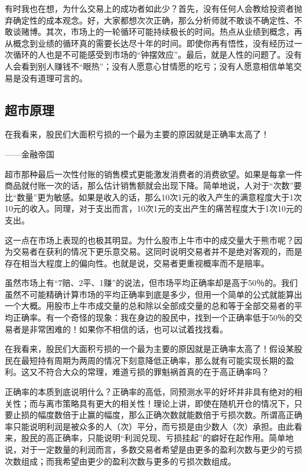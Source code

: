 有时我也在想，为什么交易上的成功者如此少？首先，没有任何人会教给投资者抛弃确定性的成本观念。好，大家都想次次正确，那么分析师就不敢谈不确定性、不敢谈赌博。其次，市场上的一轮循环可能持续极长的时间。热点从业绩到概念，再从概念到业绩的循环真的需要长达尽十年的时间。即使你再有悟性，没有经历过一次循环的人也是不可能感受到市场的“钟摆效应”。最后，就是人性的问题了。没有人会看到别人赚钱不“眼热”；没有人愿意心甘情愿的吃亏；没有人愿意相信单笔交易是没有道理可言的。

\subsection{超市原理}

{\kaishu
在我看来，股民们大面积亏损的一个最为主要的原因就是正确率太高了！

\hfill ——金融帝国
}

超市那种最后一次性付账的销售模式更能激发消费者的消费欲望。如果是每拿一件商品就付账一次的话，那么估计销售额就会出现下降。简单地说，人对于“次数”要比“数量”更为敏感。如果是收入的话，那么10次1元的收入产生的满意程度大于1次10元的收入。同理，对于支出而言，10次1元的支出产生的痛苦程度大于1次10元的支出。

这一点在市场上表现的也极其明显。为什么股市上牛市中的成交量大于熊市呢？因为交易者在获利的情况下更乐意交易。这同时说明交易者并不是绝对客观的，而是存在相当大程度上的偏向性。也就是说，交易者更重视概率而不是赔率。

虽然市场上有“7赔、2平、1赚”的说法，但市场平均正确率却是高于50％的。我们虽然不可能精确计算市场的平均正确率到底是多少，但用一个简单的公式就能算出一个大概。用股市上牛市成交量的总和除以全部成交量的总和等于全部交易者的平均正确率。有一个奇怪的现象：我在身边的股民中，找到一个正确率低于50％的交易者是非常困难的！如果你不相信的话，也可以试着找找看。

在我看来，股民们大面积亏损的一个最为主要的原因就是正确率太高了！假设某股民在最短持有周期为两周的情况下刻意降低正确率，那么就有可能实现长期的盈利。这又不符合大众的常理，难道亏损的罪魁祸首真的在于高正确率吗？

正确率的本质到底说明什么？正确率的高低，同预测水平的好坏并非具有绝对的相关性；而与离市策略具有更大的相关性！理论上讲，即使在随机开仓的情况下，只要止损的幅度数倍于止赢的幅度，那么正确次数就能数倍于亏损次数。所谓高正确率只能说明利润是被众多的人（次）平分，而亏损是由少数人（次）承担。由此看来，股民的高正确率，只能说明“利润兑现、亏损挂起”的癖好在起作用。简单地说，对于一定数量的利润而言，多数交易者希望是由更多的盈利次数与更少的亏损次数组成；而我希望由更少的盈利次数与更多的亏损次数组成。

